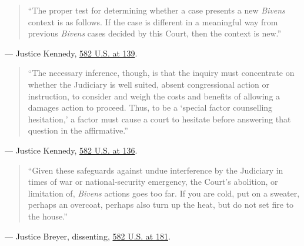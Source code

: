 \documentclass[12pt]{article}
\begin{document}
\begin{quote}
``The proper test for determining whether a case presents a new \textit{Bivens} context is as follows. If the case is different in a meaningful way from previous \textit{Bivens} cases decided by this Court, then the context is new.''
\end{quote}
\noindent --- Justice Kennedy, \href{https://www.law.cornell.edu/supremecourt/text/15-1358}{582 U.S. at 139}.

\begin{quote}
``The necessary inference, though, is that the inquiry must concentrate on whether the Judiciary is well suited, absent congressional action or instruction, to consider and weigh the costs and benefits of allowing a damages action to proceed. Thus, to be a `special factor counselling hesitation,' a factor must cause a court to hesitate before answering that question in the affirmative.''
\end{quote}
\noindent --- Justice Kennedy, \href{https://www.law.cornell.edu/supremecourt/text/15-1358}{582 U.S. at 136}.

\begin{quote}
``Given these safeguards against undue interference by the Judiciary in times of war or national-security emergency, the Court's abolition, or limitation of, \textit{Bivens} actions goes too far. If you are cold, put on a sweater, perhaps an overcoat, perhaps also turn up the heat, but do not set fire to the house.''
\end{quote}
\noindent --- Justice Breyer, dissenting, \href{https://www.law.cornell.edu/supremecourt/text/15-1358}{582 U.S. at 181}.
\end{document}
